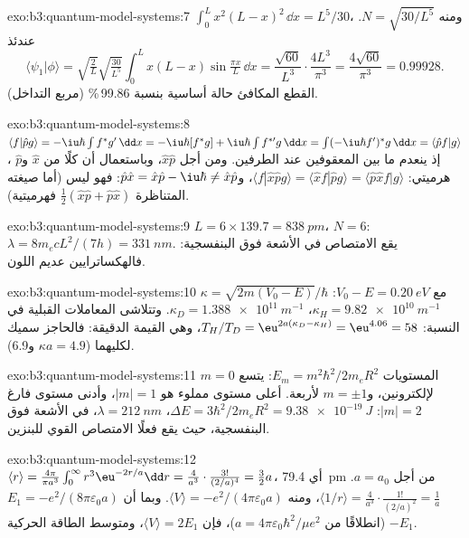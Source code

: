 \begin{solution}{exo:b3:quantum-model-systems:7}
$\int_0^Lx^2(L - x)^2\,\dd x = L^5/30$، ومنه $N = \sqrt{30/L^5}$. عندئذ
\[
\langle\psi_1|\phi\rangle = \sqrt{\tfrac2L}\sqrt{\tfrac{30}{L^5}}\int_0^Lx(L -
x)\sin\tfrac{\pi x}{L}\,\dd x = \frac{\sqrt{60}}{L^3}\cdot\frac{4L^3}{\pi^3} =
\frac{4\sqrt{60}}{\pi^3} = 0.99928 .
\]
القطع المكافئ حالة أساسية بنسبة 99.86\,\% (مربع التداخل).
\end{solution}

\begin{solution}{exo:b3:quantum-model-systems:8}
$\langle f|\hat pg\rangle = -\iu\hbar\int f^*g'\,\dd x = -\iu\hbar[f^*g] +
\iu\hbar\int f^{*\prime}g\,\dd x = \int(-\iu\hbar f')^*g\,\dd x = \langle\hat
pf|g\rangle$، إذ ينعدم ما بين المعقوفين عند الطرفين. ومن أجل $\hat x\hat p$، وباستعمال أن كلًا من $\hat x$ و$\hat p$ هرميتي:
$\langle f|\hat x\hat pg\rangle = \langle\hat xf|\hat pg\rangle = \langle\hat p\hat
xf|g\rangle$، و$\hat p\hat x = \hat x\hat p - \iu\hbar \ne \hat x\hat p$: فهو ليس
 (أما صيغته المتناظرة $\frac12(\hat x\hat p + \hat p\hat x)$ فهرميتية).
\end{solution}

\begin{solution}{exo:b3:quantum-model-systems:9}
$L = 6 \times 139.7 = \qty{838}{pm}$، $N = 6$: $\lambda = 8m_ecL^2/(7h) =
\qty{331}{nm}$. يقع الامتصاص في الأشعة فوق البنفسجية: فالهكساترايين
عديم اللون.
\end{solution}

\begin{solution}{exo:b3:quantum-model-systems:10}
$\kappa = \sqrt{2m(V_0 - E)}/\hbar$ مع $V_0 - E = \qty{0.20}{eV}$:
$\kappa_H = \qty{9.82e10}{m^{-1}}$، $\kappa_D = \qty{1.388e11}{m^{-1}}$. 
وتتلاشى المعاملات القبلية في النسبة: $T_H/T_D = \eu^{2a(\kappa_D - \kappa_H)} =
\eu^{4.06} = 58$، وهي القيمة الدقيقة: فالحاجز سميك لكليهما
($\kappa a = 4.9$ و6.9).
\end{solution}

\begin{solution}{exo:b3:quantum-model-systems:11}
المستويات $E_m = m^2\hbar^2/2m_eR^2$: يتسع $m = 0$ لإلكترونين، و$m = \pm1$
لأربعة. أعلى مستوى مملوء هو $|m| = 1$، وأدنى مستوى فارغ $|m| = 2$: $\Delta E =
3\hbar^2/2m_eR^2 = \qty{9.38e-19}{J}$، $\lambda = \qty{212}{nm}$، في الأشعة
فوق البنفسجية، حيث يقع فعلًا الامتصاص القوي للبنزين.
\end{solution}

\begin{solution}{exo:b3:quantum-model-systems:12}
$\langle r\rangle = \frac{4\pi}{\pi a^3}\int_0^\infty r^3\eu^{-2r/a}\dd r =
\frac{4}{a^3}\cdot\frac{3!}{(2/a)^4} = \frac32a$، أي \qty{79.4}{pm} من أجل $a = a_0$.
$\langle 1/r\rangle = \frac{4}{a^3}\cdot\frac{1!}{(2/a)^2} = \frac1a$، ومنه
$\langle V\rangle = -e^2/(4\pi\varepsilon_0a)$. وبما أن $E_1 =
-e^2/(8\pi\varepsilon_0a)$ (انطلاقًا من $a = 4\pi\varepsilon_0\hbar^2/\mu e^2$)،
فإن $\langle V\rangle = 2E_1$، ومتوسط الطاقة الحركية $-E_1$.
\end{solution}

